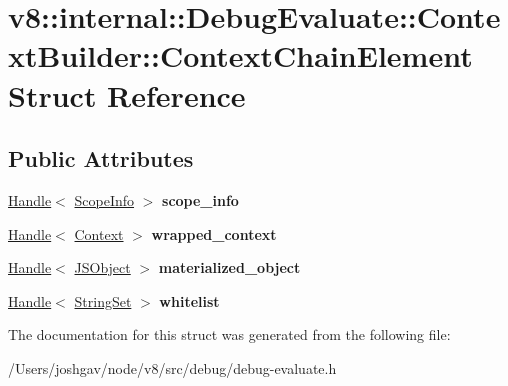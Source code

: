\hypertarget{structv8_1_1internal_1_1_debug_evaluate_1_1_context_builder_1_1_context_chain_element}{}\section{v8\+:\+:internal\+:\+:Debug\+Evaluate\+:\+:Context\+Builder\+:\+:Context\+Chain\+Element Struct Reference}
\label{structv8_1_1internal_1_1_debug_evaluate_1_1_context_builder_1_1_context_chain_element}
\subsection*{Public Attributes}
\begin{DoxyCompactItemize}
\item 
\hyperlink{classv8_1_1internal_1_1_handle}{Handle}$<$ \hyperlink{classv8_1_1internal_1_1_scope_info}{Scope\+Info} $>$ {\bfseries scope\+\_\+info}\hypertarget{structv8_1_1internal_1_1_debug_evaluate_1_1_context_builder_1_1_context_chain_element_a4ed29f472ec889e65fcbc6912dc1a1ca}{}\label{structv8_1_1internal_1_1_debug_evaluate_1_1_context_builder_1_1_context_chain_element_a4ed29f472ec889e65fcbc6912dc1a1ca}

\item 
\hyperlink{classv8_1_1internal_1_1_handle}{Handle}$<$ \hyperlink{classv8_1_1internal_1_1_context}{Context} $>$ {\bfseries wrapped\+\_\+context}\hypertarget{structv8_1_1internal_1_1_debug_evaluate_1_1_context_builder_1_1_context_chain_element_a706d4d87a07a4c3543a564f3fb8f9593}{}\label{structv8_1_1internal_1_1_debug_evaluate_1_1_context_builder_1_1_context_chain_element_a706d4d87a07a4c3543a564f3fb8f9593}

\item 
\hyperlink{classv8_1_1internal_1_1_handle}{Handle}$<$ \hyperlink{classv8_1_1internal_1_1_j_s_object}{J\+S\+Object} $>$ {\bfseries materialized\+\_\+object}\hypertarget{structv8_1_1internal_1_1_debug_evaluate_1_1_context_builder_1_1_context_chain_element_af09a8a9224a62519648bd4131ba0e67f}{}\label{structv8_1_1internal_1_1_debug_evaluate_1_1_context_builder_1_1_context_chain_element_af09a8a9224a62519648bd4131ba0e67f}

\item 
\hyperlink{classv8_1_1internal_1_1_handle}{Handle}$<$ \hyperlink{classv8_1_1internal_1_1_string_set}{String\+Set} $>$ {\bfseries whitelist}\hypertarget{structv8_1_1internal_1_1_debug_evaluate_1_1_context_builder_1_1_context_chain_element_a47fa19e620f4c96fdaaec5f0277c96e0}{}\label{structv8_1_1internal_1_1_debug_evaluate_1_1_context_builder_1_1_context_chain_element_a47fa19e620f4c96fdaaec5f0277c96e0}

\end{DoxyCompactItemize}


The documentation for this struct was generated from the following file\+:\begin{DoxyCompactItemize}
\item 
/\+Users/joshgav/node/v8/src/debug/debug-\/evaluate.\+h\end{DoxyCompactItemize}

